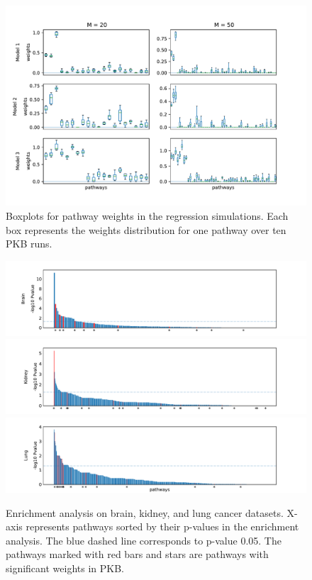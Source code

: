 \documentclass[a4paper,12pt]{article}
\begin{document}
	
	\newpage
	\begin{figure}[htp]
		\centering
		\includegraphics[width=1.07\textwidth]{simu_reg_weights.pdf}
		\caption{Boxplots for pathway weights in the regression simulations. Each box represents the weights distribution for one pathway over ten PKB runs.}
		\label{fig:reg_weights}
	\end{figure}
\newpage
\begin{figure}[h]
	\centering
	\includegraphics[width=\textwidth]{GSEA_Brain.pdf}\\ \vspace{-3mm}
	\includegraphics[width=\textwidth]{GSEA_Kidney.pdf}\\ \vspace{-3mm}
	\includegraphics[width=\textwidth]{GSEA_Lung.pdf}
	\caption{Enrichment analysis on brain, kidney, and lung cancer datasets. X-axis represents pathways sorted by their p-values in the enrichment analysis. The blue dashed line corresponds to p-value 0.05. The pathways marked with red bars and stars are pathways with significant weights in PKB.}
	\label{fig:gsea}
\end{figure}
\end{document}
